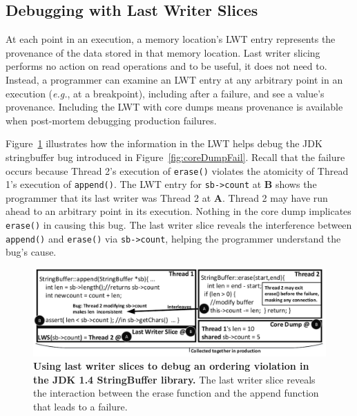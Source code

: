 \documentclass[preprint,9pt]{sigplanconf}
\newcommand{\lwt}{LWT\xspace}
\begin{document}
\subsection{Debugging with Last Writer Slices}
\label{sec:debugging}

At each point in an execution, a memory location's \lwt entry represents the
provenance of the data stored in that memory location.   Last writer slicing
performs no action on read operations and to be useful, it does not need to.
Instead, a programmer can examine an \lwt entry at any arbitrary point in an
execution ({\em e.g.}, at a breakpoint), including after a failure, and see a
value's provenance.  Including the \lwt with core dumps means provenance is
available when post-mortem debugging production failures.

Figure~\ref{fig:jdklws} illustrates how the information in the \lwt helps debug
the JDK stringbuffer bug introduced in Figure~\ref{fig:coreDumpFail}.  Recall
that the failure occurs because Thread 2's execution of {\tt erase()} violates
the atomicity of Thread 1's execution of {\tt append()}.  The \lwt entry for
{\tt sb->count} at {\bf B} shows the programmer that its last writer was Thread
2 at {\bf A}. Thread 2 may have run ahead to an arbitrary point in its
execution.  Nothing in the core dump implicates {\tt erase()} in causing
this bug.  The last writer slice reveals the interference between {\tt append()}
and {\tt erase()} via {\tt sb->count}, helping the programmer understand the
bug's cause.




\begin{figure}[h]
\centering
\includegraphics[width=\columnwidth]{figs/JDKStringBufferDebug2.pdf}
\caption{\label{fig:jdklws}{\bf Using last writer slices to debug an
ordering violation in the JDK 1.4 StringBuffer library.} The last writer slice reveals the interaction between the erase function and the append function that leads to a failure.}
\end{figure}
\end{document}
